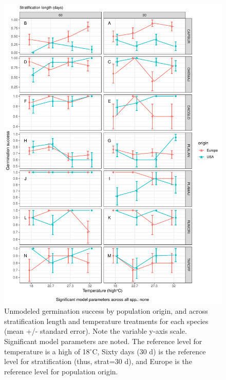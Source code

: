 \documentclass[12pt]{article}\usepackage[]{graphicx}\usepackage[]{color}
\begin{document}
\begin{figure}[H]
  \centering
  \includegraphics[scale=.8]{figure5}  %
  \caption{Unmodeled germination success by population origin, and across stratification length and temperature treatments for each species (mean +/- standard error). Note the variable y-axis scale. Significant model parameters are noted. The reference level for temperature is a high of 18$^\circ$C, Sixty days (30 d) is the reference level for stratification (thus, strat=30 d), and Europe is the reference level for population origin.} \label{fig:rawrate}
\end{figure}
\end{document}
